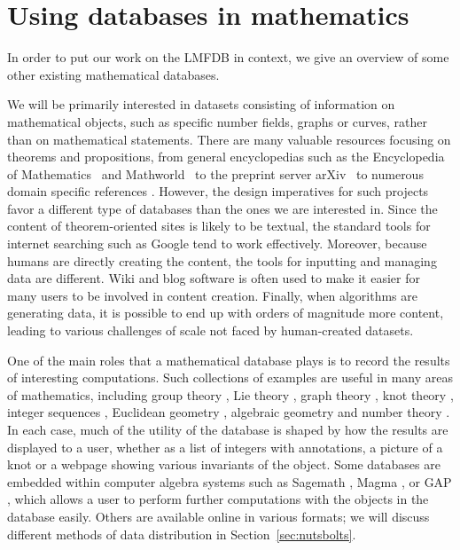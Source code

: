 \documentclass{amsart}
\begin{document}
\section{Using databases in mathematics}

In order to put our work on the LMFDB in context, we give an overview of some other existing mathematical databases.

We will be primarily interested in datasets consisting of information on mathematical objects, such as specific number fields, graphs or curves, rather than on mathematical statements.
There are many valuable resources focusing on theorems and propositions, from general encyclopedias such as the Encyclopedia of Mathematics~\cite{encofmath} and Mathworld~\cite{mathworld} to the preprint server arXiv~\cite{arxiv} to numerous domain specific references \cites{groupprops, graphclasses, complexityzoo}.
However, the design imperatives for such projects favor a different type of databases than the ones we are interested in.
Since the content of theorem-oriented sites is likely to be textual, the standard tools for internet searching such as Google tend to work effectively.
Moreover, because humans are directly creating the content, the tools for inputting and managing data are different.
Wiki \cites{cantorsattic, complexityzoo, groupprops, knotatlas} and blog \cite{fanosearch} software is often used to make it easier for many users to be involved in content creation.
Finally, when algorithms are generating data, it is possible to end up with orders of magnitude more content, leading to various challenges of scale not faced by human-created datasets.

One of the main roles that a mathematical database plays is to record the results of interesting computations.
Such collections of examples are useful in many areas of mathematics, including group theory \cites{groupatlas, smallgroups, transgroups, groupnames}, Lie theory \cites{lieatlas, umrk}, graph theory \cite{hog}, knot theory \cite{knotinfo}, integer sequences \cite{oeis}, Euclidean geometry \cite{etc}, algebraic geometry \cite{fanosearch} and number theory \cites{primepages, lmfdb}.
In each case, much of the utility of the database is shaped by how the results are displayed to a user, whether as a list of integers with annotations, a picture of a knot or a webpage showing various invariants of the object.
Some databases \cites{magmadb, smallgroups, transgroups} are embedded within computer algebra systems such as Sagemath \cite{sage}, Magma \cite{magma}, or GAP \cite{gap},
which allows a user to perform further computations with the objects in the database easily.
Others are available online in various formats; we will discuss different methods of data distribution in Section~\ref{sec:nutsbolts}.
\end{document}
